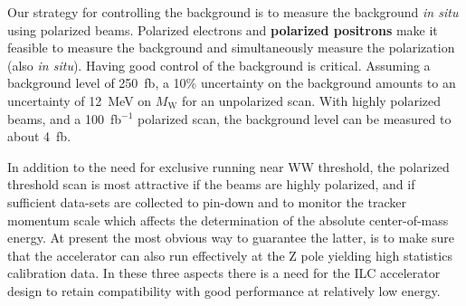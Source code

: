 \documentclass[12pt]{article}
\begin{document}
Our strategy for controlling the background is to measure the background {\it in situ} using polarized beams. 
Polarized electrons and {\bf polarized positrons} make it feasible to measure the background 
and simultaneously measure the polarization (also {\it in situ}).
Having good control of the background is critical. Assuming a background level of 250~fb, a 10\% uncertainty on the 
background amounts to an uncertainty of 12~MeV on $M_{\mathrm{W}}$ for 
an unpolarized scan. With highly polarized beams, and a 100~fb$^{-1}$ polarized scan, 
the background level can be measured to about 4~fb. 

In addition to the need for exclusive running near WW threshold, the polarized threshold scan 
is most attractive if the beams are highly polarized, and if sufficient data-sets are collected to pin-down and 
to monitor the tracker momentum scale which affects the determination of the absolute center-of-mass energy. 
At present the most obvious way to guarantee the latter, is to make sure that the accelerator can also run 
effectively at the Z pole yielding high statistics calibration data.
In these three aspects there is a need for the ILC accelerator design to retain compatibility with 
good performance at relatively low energy.
\end{document}
